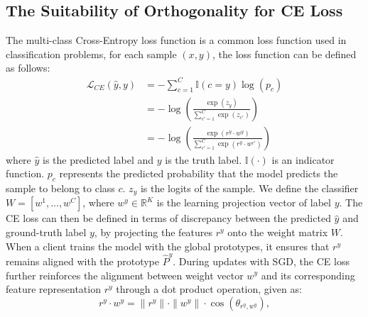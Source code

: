 \subsection{The Suitability of Orthogonality for CE Loss}
The multi-class Cross-Entropy loss function is a common loss function used in classification problems, for each sample $(x, y)$, the loss function can be defined as follows: 
\begin{align}
    \mathcal{L}_{CE}(\hat{y}, y) 
    &= -\sum_{c=1}^{C} \mathbb{I}(c = y) \log(p_c)
    \nonumber\\
    &= - \log\left(\frac{\exp(z_{y})}{\sum_{c' = 1}^{C} \exp(z_{c'})} \right)\\
    &= - \log \left( \frac{\exp(r^y \cdot w^y)}{\sum_{c' = 1}^{C} \exp(r^y \cdot w^{c'})} \nonumber\right)
     \label{eq:cross_entropy}
\end{align}
where $\hat{y}$ is the predicted label and $y$ is the truth label. $\mathbb{I}\left(\cdot\right)$ is an indicator function. $p_{c}$ represents the predicted probability that the model predicts the sample to belong to class $c$. $z_y$ is the logits of the sample. 
We define the classifier $W = [w^1, ... , w^C]$, where $w^y \in \mathbb{R}^K$ is the learning projection vector of label $y$. The CE loss can then be defined in terms of discrepancy between the predicted $\hat{y}$ and ground-truth label $y$, by projecting the features $r^y$ onto the weight matrix $W$. When a client trains the model with the global prototypes, it ensures that $r^y$ remains aligned with the prototype $\hat{P}^y$. During updates with SGD, the CE loss further reinforces the alignment between weight vector $w^y$ and its corresponding feature representation $r^y$ through a dot product operation, given as: 
\begin{equation}
r^y \cdot w^y=\|r^y\|\cdot\|w^y\|\cdot\cos(\theta_{r^y,w^y}),
\label{eq:dot product}
\end{equation}
